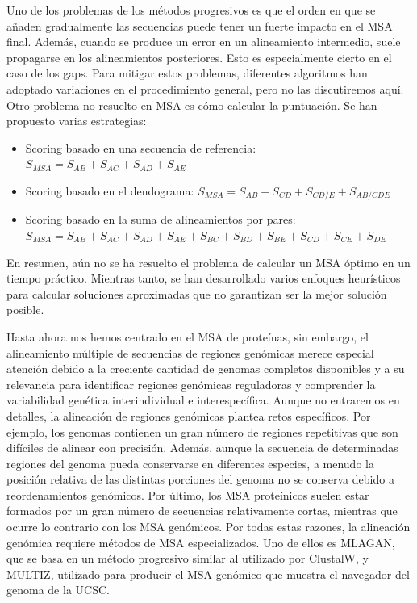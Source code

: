 Uno de los problemas de los métodos progresivos es que el orden en que se añaden gradualmente las secuencias puede tener un fuerte impacto en el MSA final. Además, cuando se produce un error en un alineamiento intermedio, suele propagarse en los alineamientos posteriores. Esto es especialmente cierto en el caso de los gaps. Para mitigar estos problemas, diferentes algoritmos han adoptado variaciones en el procedimiento general, pero no las discutiremos aquí. Otro problema no resuelto en MSA es cómo calcular la puntuación. Se han propuesto varias estrategias:
\begin{itemize}
\item Scoring basado en una secuencia de referencia: $S_{MSA} = S_{AB} + S_{AC} + S_{AD} + S_{AE} $
\item Scoring basado en el dendograma: $S_{MSA} = S_{AB} + S_{CD} + S_{CD/E} + S_{AB/CDE}$
\item Scoring basado en la suma de alineamientos por pares: $S_{MSA} = S_{AB} + S_{AC} + S_{AD} + S_{AE} + S_{BC} + S_{BD} + S_{BE} + S_{CD} + S_{CE} + S_{DE}$
\end{itemize}

En resumen, aún no se ha resuelto el problema de calcular un MSA óptimo en un tiempo práctico. Mientras tanto, se han desarrollado varios enfoques heurísticos para calcular soluciones aproximadas que no garantizan ser la mejor solución posible.

Hasta ahora nos hemos centrado en el MSA de proteínas, sin embargo, el alineamiento múltiple de secuencias de regiones genómicas merece especial atención debido a la creciente cantidad de genomas completos disponibles y a su relevancia para identificar regiones genómicas reguladoras y comprender la variabilidad genética interindividual e interespecífica. Aunque no entraremos en detalles, la alineación de regiones genómicas plantea retos específicos. Por ejemplo, los genomas contienen un gran número de regiones repetitivas que son difíciles de alinear con precisión. Además, aunque la secuencia de determinadas regiones del genoma pueda conservarse en diferentes especies, a menudo la posición relativa de las distintas porciones del genoma no se conserva debido a reordenamientos genómicos. Por último, los MSA proteínicos suelen estar formados por un gran número de secuencias relativamente cortas, mientras que ocurre lo contrario con los MSA genómicos. Por todas estas razones, la alineación genómica requiere métodos de MSA especializados. Uno de ellos es MLAGAN, que se basa en un método progresivo similar al utilizado por ClustalW, y MULTIZ, utilizado para producir el MSA genómico que muestra el navegador del genoma de la UCSC.

